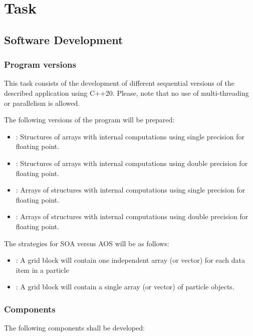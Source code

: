\section{Task}

\subsection{Software Development}

\subsubsection{Program versions}
\label{sec:tasks:versions}

This task consists of the development of different sequential versions
of the described application using C++20. Please, note that no use of
multi-threading or parallelism is allowed.

The following versions of the program will be prepared:
\begin{itemize}
\item {}: Structures of arrays with internal computations
using single precision for floating point.
\item {}: Structures of arrays with internal computations
using double precision for floating point.
\item {}: Arrays of structures with internal computations
using single precision for floating point.
\item {}: Arrays of structures with internal computations
using double precision for floating point.
\end{itemize}

The strategies for SOA versus AOS will be as follows:

\begin{itemize}
  \item {}:
        A grid block will contain one independent array (or vector) for
        each data item in a particle
  \item {}:
        A grid block will contain a single array (or vector) of particle objects.
\end{itemize}

\subsubsection{Components}

The following components shall be developed:

